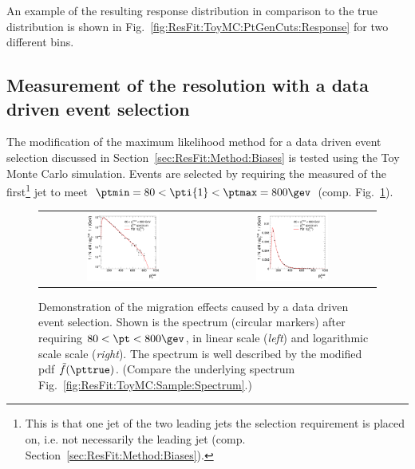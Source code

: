 An example of the resulting response distribution in comparison to the true
distribution is shown in Fig.~\ref{fig:ResFit:ToyMC:PtGenCuts:Response} for
two different \pttrue bins.


\subsection{Measurement of the resolution with a data driven event
  selection}\label{sec:ResFit:ToyMC:PtCaloCuts}

The modification of the maximum likelihood method for a data driven
event selection discussed in Section~\ref{sec:ResFit:Method:Biases} is
tested using the Toy Monte Carlo simulation.
Events are selected by requiring the measured \pt of the
first\footnote{This is that one jet of the two leading jets the
  selection requirement is placed on, i.e. not necessarily the leading
  jet (comp. Section~\ref{sec:ResFit:Method:Biases}).} jet to
meet \mbox{$\ptmin = 80 < \pti{1} < \ptmax = 800\gev$} (comp. Fig.~\ref{fig:ResFit:ToyMC:PtCuts:Spectrum}).

\begin{figure}[ht]
  \centering
  \begin{tabular}{cc}
    \includegraphics[width=0.45\textwidth]{figures/resFit_ToyMC_PtCuts_SpectrumLog} &
    \includegraphics[width=0.45\textwidth]{figures/resFit_ToyMC_PtCuts_SpectrumLinear} \\
  \end{tabular}
  \caption{Demonstration of the migration effects caused by a data
    driven event selection.
    Shown is the \pttrue spectrum (circular markers) after
    requiring \mbox{$80 < \pt < 800\gev$}, in linear scale
    (\textit{left}) and logarithmic scale scale (\textit{right}).
    The spectrum is well described by the modified pdf
    $\tilde{f}(\pttrue)$.
    (Compare the underlying spectrum Fig.~\ref{fig:ResFit:ToyMC:Sample:Spectrum}.)
  }
  \label{fig:ResFit:ToyMC:PtCuts:Spectrum}
\end{figure}



